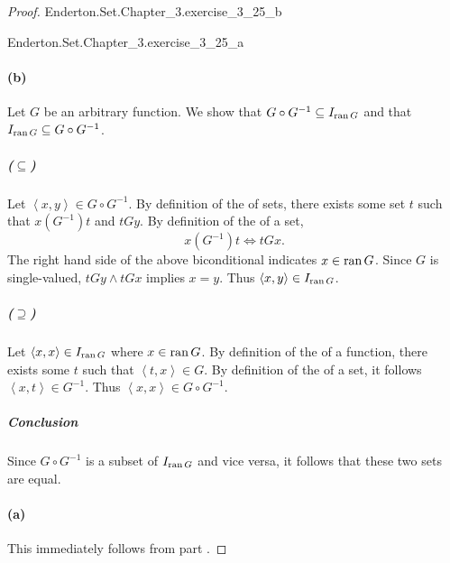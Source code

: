 \documentclass{report}
\begin{document}
\begin{proof}

  \statementpadding

    {Enderton.Set.Chapter\_3.exercise\_3\_25\_b}

    {Enderton.Set.Chapter\_3.exercise\_3\_25\_a}

  \paragraph{(b)}%
  \label{par:exercise-3.25-b}

    Let $G$ be an arbitrary function.
    We show that $G \circ G^{-1} \subseteq I_{\mathop{\text{ran}}{G}}$ and that
      $I_{\mathop{\text{ran}}{G}} \subseteq G \circ G^{-1}$.

    \subparagraph{($\subseteq$)}%

      Let $\left< x, y \right> \in G \circ G^{-1}$.
      By definition of the  of sets, there exists some
        set $t$ such that $x(G^{-1})t$ and $tGy$.
      By definition of the  of a set,
        $$x(G^{-1})t \iff tGx.$$
      The right hand side of the above biconditional indicates $x \in \mathop{\text{ran}}{G}$.
      Since $G$ is single-valued, $tGy \land tGx$ implies $x = y$.
      Thus $\left< x, y \right> \in I_{\mathop{\text{ran}}{G}}$.

    \subparagraph{($\supseteq$)}%

      Let $\left< x, x \right> \in I_{\mathop{\text{ran}}{G}}$ where $x \in \mathop{\text{ran}}{G}$.
      By definition of the  of a function, there exists some
        $t$ such that $\left< t, x \right> \in G$.
      By definition of the  of a set, it follows
        $\left< x, t \right> \in G^{-1}$.
      Thus $\left< x, x \right> \in G \circ G^{-1}$.

    \subparagraph{Conclusion}%

      Since $G \circ G^{-1}$ is a subset of $I_{\mathop{\text{ran}}{G}}$ and vice versa, it
        follows that these two sets are equal.

  \paragraph{(a)}%

    This immediately follows from part .

\end{proof}

\subsection{}%
\label{sub:exercise-3.26}
\end{document}
